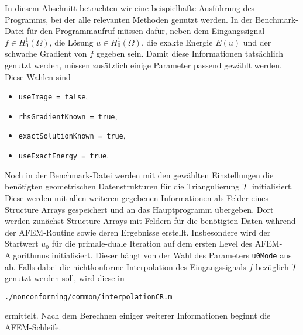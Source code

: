 In diesem Abschnitt betrachten wir eine beispielhafte Ausführung des Programms,
bei der alle relevanten Methoden genutzt werden.
In der Benchmark-Datei für den Programmaufruf müssen dafür, neben dem
Eingangssignal $f\in H^1_0(\Omega)$, die Lösung $u\in H^1_0(\Omega)$, die
exakte Energie $E(u)$ und der schwache Gradient von $f$ gegeben sein. 
Damit diese Informationen tatsächlich genutzt werden, müssen zusätzlich einige
Parameter passend gewählt werden. 
Diese Wahlen sind
\begin{itemize}
  \item \texttt{useImage = false},
  \item \texttt{rhsGradientKnown = true},
  \item \texttt{exactSolutionKnown = true},
  \item \texttt{useExactEnergy = true}.
\end{itemize}
Noch in der Benchmark-Datei werden mit den gewählten Einstellungen die
benötigten geometrischen Datenstrukturen für die Triangulierung $\mathcal{T}$
initialisiert. 
Diese werden mit allen weiteren gegebenen Informationen als Felder eines
Structure Arrays gespeichert und an das Hauptprogramm übergeben. 
Dort werden zunächst Structure Arrays mit Feldern für die benötigten Daten
während der AFEM-Routine sowie deren Ergebnisse erstellt. 
Insbesondere wird der Startwert $u_0$ für die primale-duale Iteration
auf dem ersten Level des AFEM-Algorithmus initialisiert. 
Dieser hängt von der Wahl des Parameters \texttt{u0Mode} aus
 ab.
Falls dabei die nichtkonforme Interpolation des Eingangssignals $f$ 
bezüglich $\mathcal{T}$ genutzt werden soll, wird diese in
\begin{center}
  \texttt{./nonconforming/common/interpolationCR.m}
\end{center}
ermittelt.
Nach dem Berechnen einiger weiterer Informationen beginnt die AFEM-Schleife.

